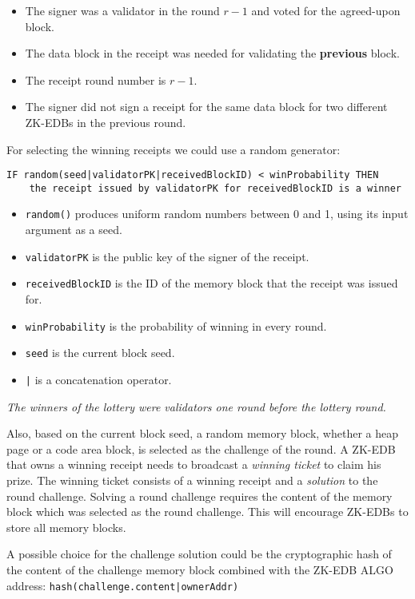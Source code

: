 \documentclass[11pt, A4]{report}
\begin{document}
    \begin{itemize}
        \item The signer was a validator in the round \(r - 1\) and voted for the agreed-upon block.
        \item The data block in the receipt was needed for validating the \textbf{previous} block.
        \item The receipt round number is \(r - 1\).
        \item The signer did not sign a receipt for the same data block for two different ZK-EDBs in the previous round.
    \end{itemize}
    For selecting the winning receipts we could use a random generator:
    \begin{verbatim}
IF random(seed|validatorPK|receivedBlockID) < winProbability THEN
    the receipt issued by validatorPK for receivedBlockID is a winner
    \end{verbatim}
    \begin{itemize}
        \item \texttt{random()} produces uniform random numbers between 0 and 1, using its input argument as a seed.
        \item \texttt{validatorPK} is the public key of the signer of the receipt.
        \item \texttt{receivedBlockID} is the ID of the memory block that the receipt was issued for.
        \item \texttt{winProbability} is the probability of winning in every round.
        \item \texttt{seed} is the current block seed.
        \item \texttt{|} is a concatenation operator.
    \end{itemize}

    \emph{The winners of the lottery were validators one round before the lottery round.}

    Also, based on the current block seed, a random memory block, whether a heap page or a code area block, is
    selected as the challenge of the round. A ZK-EDB that owns a winning receipt needs to broadcast a \emph{winning
    ticket} to claim his prize. The winning ticket consists of a winning receipt and a \emph{solution} to the round
    challenge. Solving a round challenge requires the content of the memory block which was selected as the round
    challenge. This will encourage ZK-EDBs to store all memory blocks.

    A possible choice for the challenge solution could be the cryptographic hash of the content of the challenge
    memory block combined with the ZK-EDB ALGO address: \texttt{hash(challenge.content|ownerAddr)}
\end{document}
